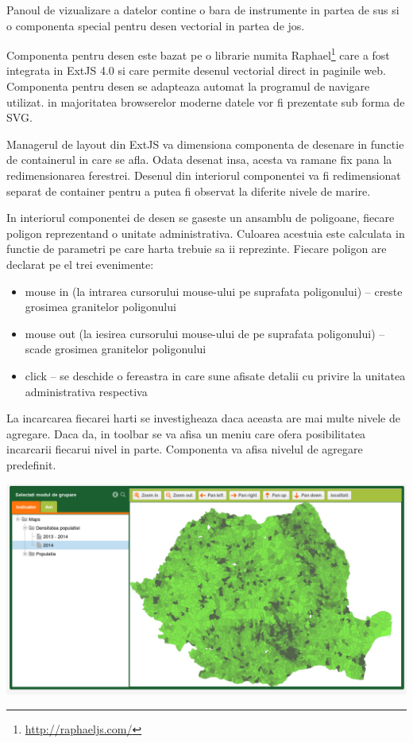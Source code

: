 \documentclass[a4paper, 10pt]{article}
\begin{document}
{Panoul de vizualizare a datelor contine o bara de instrumente in partea de sus si o componenta special pentru desen vectorial in partea de jos. 

Componenta pentru desen este bazat pe o librarie numita Raphael\footnote{\url{http://raphaeljs.com/}} care a fost integrata in ExtJS 4.0 si care permite desenul vectorial direct in paginile web. 
Componenta pentru desen se adapteaza automat la programul de navigare utilizat. in majoritatea browserelor moderne datele vor fi prezentate sub forma de SVG. 

Managerul de layout din ExtJS va dimensiona componenta de desenare in functie de containerul in care se afla. 
Odata desenat insa, acesta va ramane fix pana la redimensionarea ferestrei. 
Desenul din interiorul componentei va fi redimensionat separat de container pentru a putea fi observat la diferite nivele de marire. 

In interiorul componentei de desen se gaseste un ansamblu de poligoane, fiecare poligon reprezentand o unitate administrativa. 
Culoarea acestuia este calculata in functie de parametri pe care harta trebuie sa ii reprezinte. 
Fiecare poligon are declarat pe el trei evenimente:

\begin{itemize}
\item
mouse in (la intrarea cursorului mouse-ului pe suprafata poligonului) -- creste grosimea granitelor poligonului
\item
mouse out (la iesirea cursorului mouse-ului de pe suprafata poligonului) -- scade grosimea granitelor poligonului
\item
click -- se deschide o fereastra in care sune afisate detalii cu privire la unitatea administrativa respectiva
\end{itemize}

La incarcarea fiecarei harti se investigheaza daca aceasta are mai multe nivele de agregare. 
Daca da, in toolbar se va afisa un meniu care ofera posibilitatea incarcarii fiecarui nivel in parte. 
Componenta va afisa nivelul de agregare predefinit. 

\includegraphics[width=\textwidth]{img/geo-map}

}
\end{document}
